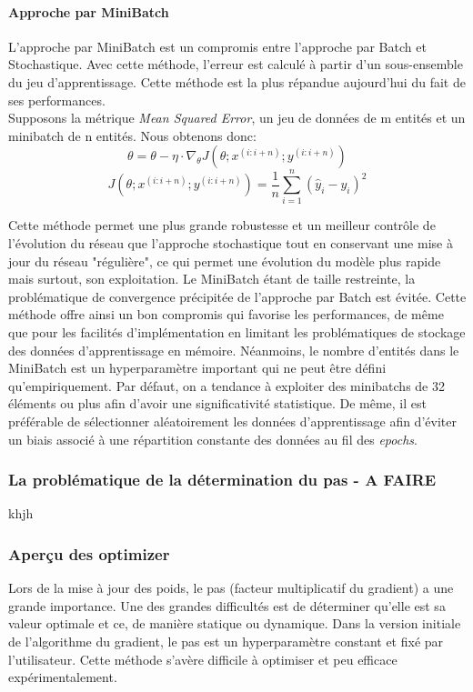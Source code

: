 \paragraph{Approche par MiniBatch}

\noindent L'approche par MiniBatch est un compromis entre l'approche par Batch et Stochastique. Avec cette méthode, l'erreur est calculé à partir d'un sous-ensemble du jeu d'apprentissage. Cette méthode est la plus répandue aujourd'hui du fait de ses performances.\\

\noindent Supposons la métrique \textit{Mean Squared Error}, un jeu de données de m entités et un minibatch de n entités. Nous obtenons donc:
$$\theta = \theta - \eta \cdot \nabla_\theta J( \theta; x^{(i:i+n)}; y^{(i:i+n)})$$
$$ J( \theta; x^{(i:i+n)}; y^{(i:i+n)}) = \frac{1}{n}\sum_{i=1}^n(\hat{y}_i-y_i)^2$$

\noindent Cette méthode permet une plus grande robustesse et un meilleur contrôle de l'évolution du réseau que l'approche stochastique tout en conservant une mise à jour du réseau "régulière", ce qui permet une évolution du modèle plus rapide mais surtout, son exploitation. Le MiniBatch étant de taille restreinte, la problématique de convergence précipitée de l'approche par Batch est évitée. Cette méthode offre ainsi un bon compromis qui favorise les performances, de même que pour les facilités d'implémentation en limitant les problématiques de stockage des données d'apprentissage en mémoire. Néanmoins, le nombre d'entités dans le MiniBatch est un hyperparamètre important qui ne peut être défini qu'empiriquement. Par défaut, on a tendance à exploiter des minibatchs de 32 éléments ou plus afin d'avoir une significativité statistique. De même, il est préférable de sélectionner aléatoirement les données d'apprentissage afin d'éviter un biais associé à une répartition constante des données au fil des \textit{epochs}.

\subsubsection{La problématique de la détermination du pas - A FAIRE}

khjh

\subsubsection{Aperçu des optimizer}

Lors de la mise à jour des poids, le pas (facteur multiplicatif du gradient) a une grande importance. Une des grandes difficultés est de déterminer qu'elle est sa valeur optimale et ce, de manière statique ou dynamique. Dans la version initiale de l'algorithme du gradient, le pas est un hyperparamètre constant et fixé par l'utilisateur. Cette méthode s'avère difficile à optimiser et peu efficace expérimentalement.\\

